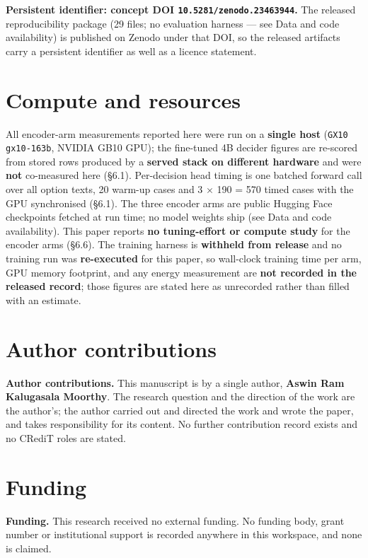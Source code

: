 \documentclass[11pt,a4paper]{article}
\begin{document}
\textbf{Persistent identifier: concept DOI \texttt{10.5281/zenodo.23463944}.} The released reproducibility package (29 files; no evaluation harness --- see Data and code availability) is published on Zenodo under that DOI, so the released artifacts carry a persistent identifier as well as a licence statement.

\section*{Compute and resources}

All encoder-arm measurements reported here were run on a \textbf{single host} (\texttt{GX10 gx10-163b}, NVIDIA GB10 GPU); the fine-tuned 4B decider figures are re-scored from stored rows produced by a \textbf{served stack on different hardware} and were \textbf{not} co-measured here (\S6.1). Per-decision head timing is one batched forward call over all option texts, 20 warm-up cases and 3 $\times$ 190 = 570 timed cases with the GPU synchronised (\S6.1). The three encoder arms are public Hugging Face checkpoints fetched at run time; no model weights ship (see Data and code availability). This paper reports \textbf{no tuning-effort or compute study} for the encoder arms (\S6.6). The training harness is \textbf{withheld from release} and no training run was \textbf{re-executed} for this paper, so wall-clock training time per arm, GPU memory footprint, and any energy measurement are \textbf{not recorded in the released record}; those figures are stated here as unrecorded rather than filled with an estimate.

\section*{Author contributions}

\textbf{Author contributions.} This manuscript is by a single author, \textbf{Aswin Ram Kalugasala Moorthy}. The research question and the direction of the work are the author's; the author carried out and directed the work and wrote the paper, and takes responsibility for its content. No further contribution record exists and no CRediT roles are stated.

\section*{Funding}

\textbf{Funding.} This research received no external funding. No funding body, grant number or institutional support is recorded anywhere in this workspace, and none is claimed.
\end{document}
